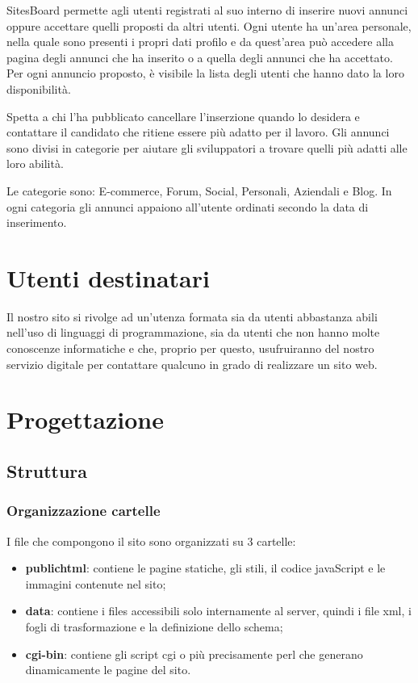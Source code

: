 \documentclass[12pt]{article}
\begin{document}
SitesBoard permette agli utenti registrati al suo interno di inserire nuovi annunci oppure accettare quelli proposti da altri utenti.
Ogni utente ha un’area personale, nella quale sono presenti i propri dati profilo e da quest’area può accedere alla pagina degli annunci che ha inserito o a quella degli annunci che ha accettato.
Per ogni annuncio proposto, è visibile la lista degli utenti che hanno dato la loro disponibilità. 

Spetta a chi l’ha pubblicato cancellare l'inserzione quando lo desidera e contattare il candidato che ritiene essere più adatto per il lavoro.
Gli annunci sono divisi in categorie per aiutare gli sviluppatori a trovare quelli più adatti alle loro abilità. 

Le categorie sono: E-commerce, Forum, Social, Personali, Aziendali e Blog.
In ogni categoria gli annunci appaiono all’utente ordinati secondo la data di inserimento.



\section{Utenti destinatari}
Il nostro sito si rivolge ad un’utenza formata sia da utenti abbastanza abili nell’uso di linguaggi di programmazione, sia da utenti che non hanno molte conoscenze informatiche e che, proprio per questo, usufruiranno del nostro servizio digitale per contattare qualcuno in grado di realizzare un sito web.
\newpage

\section{Progettazione}
	\subsection{Struttura}
		\subsubsection{Organizzazione cartelle}
		
		I file che compongono il sito sono organizzati su 3 cartelle:

		\begin{itemize}

			\item \textbf{public\textunderscore html}: contiene le pagine statiche, gli stili, il codice javaScript e le immagini contenute nel sito;
			\item \textbf{data}: contiene i files accessibili solo internamente al server, quindi i file xml, i fogli di trasformazione e la definizione dello schema;
			\item \textbf{cgi-bin}: contiene gli script cgi o più precisamente perl che generano dinamicamente le pagine del sito.

		\end{itemize}
\end{document}
